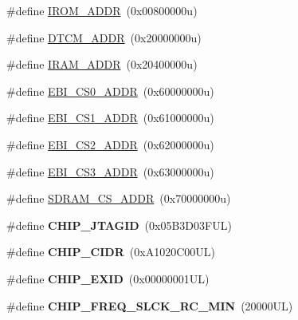 \begin{DoxyCompactItemize}
\item 
\#define \mbox{\hyperlink{group__SAME70N20__definitions_ga694212ffb8c2786bacee3d0ad6020bda}{I\+R\+O\+M\+\_\+\+A\+D\+DR}}~(0x00800000u)
\item 
\#define \mbox{\hyperlink{group__SAME70N20__definitions_ga26626a425f7ebb3a0c2dbc276f0d9f78}{D\+T\+C\+M\+\_\+\+A\+D\+DR}}~(0x20000000u)
\item 
\#define \mbox{\hyperlink{group__SAME70N20__definitions_gaae45ac2ef16942159481c767ac4805cf}{I\+R\+A\+M\+\_\+\+A\+D\+DR}}~(0x20400000u)
\item 
\#define \mbox{\hyperlink{group__SAME70N20__definitions_ga9bcbb97ddae3b2cc5e2c9613d33f66b4}{E\+B\+I\+\_\+\+C\+S0\+\_\+\+A\+D\+DR}}~(0x60000000u)
\item 
\#define \mbox{\hyperlink{group__SAME70N20__definitions_gaaddd9fdbbc77c9aced5308819f502a26}{E\+B\+I\+\_\+\+C\+S1\+\_\+\+A\+D\+DR}}~(0x61000000u)
\item 
\#define \mbox{\hyperlink{group__SAME70N20__definitions_ga058a35f9991487dc2dd12ada792d0730}{E\+B\+I\+\_\+\+C\+S2\+\_\+\+A\+D\+DR}}~(0x62000000u)
\item 
\#define \mbox{\hyperlink{group__SAME70N20__definitions_gad66ebdd0fc33ec3cf85dbaa14bbf05d9}{E\+B\+I\+\_\+\+C\+S3\+\_\+\+A\+D\+DR}}~(0x63000000u)
\item 
\#define \mbox{\hyperlink{group__SAME70N20__definitions_ga61b7db25daf759c2a2beb6e5a0b57a84}{S\+D\+R\+A\+M\+\_\+\+C\+S\+\_\+\+A\+D\+DR}}~(0x70000000u)
\item 
\mbox{\label{group__SAME70N20__definitions_gaa614519778eec0df55d3eeab3223e3f6}} 
\#define {\bfseries C\+H\+I\+P\+\_\+\+J\+T\+A\+G\+ID}~(0x05\+B3\+D03\+F\+U\+L)
\item 
\mbox{\label{group__SAME70N20__definitions_ga1e1ae44dd9269a8a98c1d7e7a60e9fbd}} 
\#define {\bfseries C\+H\+I\+P\+\_\+\+C\+I\+DR}~(0x\+A1020\+C00\+U\+L)
\item 
\mbox{\label{group__SAME70N20__definitions_ga35123717aa86b76bb6b73cf3adc4c2e6}} 
\#define {\bfseries C\+H\+I\+P\+\_\+\+E\+X\+ID}~(0x00000001\+U\+L)
\item 
\mbox{\label{group__SAME70N20__definitions_ga0e868bf27426399dfdcb3a9dfc3733c4}} 
\#define {\bfseries C\+H\+I\+P\+\_\+\+F\+R\+E\+Q\+\_\+\+S\+L\+C\+K\+\_\+\+R\+C\+\_\+\+M\+IN}~(20000\+U\+L)

\end{DoxyCompactItemize}
